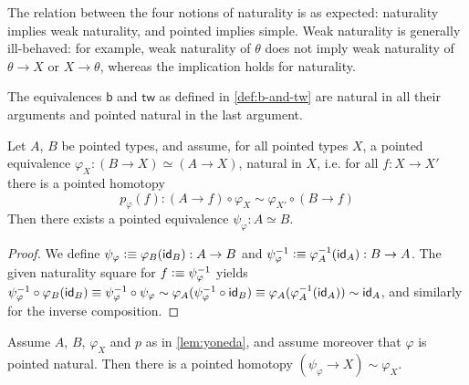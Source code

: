 \documentclass{article}
\renewcommand{\phi}{\varphi}
\renewcommand{\o}{\ensuremath{\circ}}
\newcommand{\sy}{^{-1}}
\newcommand{\two}{\mathsf{b}}
\newcommand{\twist}{\mathsf{tw}}
\begin{document}
\begin{rmk}
	The relation between the four notions of naturality is as expected: naturality implies weak naturality, and pointed implies simple. Weak naturality is generally ill-behaved: for example, weak naturality of $\theta$ does not imply weak naturality of $\theta \to X$ or $X \to \theta$, whereas the implication holds for naturality.
\end{rmk}

\begin{rmk}
	The equivalences $\two$ and $\twist$ as defined in \autoref{def:b-and-tw} are natural in all their arguments and pointed natural in the last argument.
\end{rmk}

\begin{lem}[Yoneda]\label{lem:yoneda}
	Let $A$, $B$ be pointed types, and assume, for all pointed types $X$, a pointed equivalence $\phi_X : (B \to X) \simeq (A \to X)$, natural in $X$, i.e. for all $f : X \to X'$ there is a pointed homotopy \[ p_\phi(f) : (A \to f) \o \phi_X \sim \phi_{X'} \o (B \to f) \]
	Then there exists a pointed equivalence $\psi_\phi : A \simeq B$.
\end{lem}
\begin{proof}
	We define $\psi_\phi \defeq \phi_B(\idfunc[B]) : A \to B$ and $\psi_\phi\sy \defeq \phi_A\sy(\idfunc[A]):B\to A$. The given naturality square for $f \defeq \psi_\phi\sy$ yields $\psi_\phi\sy \o \phi_B (\idfunc[B]) \judgeq \psi_\phi\sy \o \psi_\phi \sim \phi_A (\psi_\phi\sy \o \idfunc[B]) \judgeq \phi_A (\phi_A\sy (\idfunc[A])) \sim \idfunc[A]$, and similarly for the inverse composition.
\end{proof}

\begin{lem}\label{lem:yoneda-pointed}
	Assume $A$, $B$, $\phi_X$ and $p$ as in \autoref{lem:yoneda}, and assume moreover that $\phi$ is pointed natural. Then there is a pointed homotopy $(\psi_\phi \to X) \sim \phi_X$.
\end{lem}
\end{document}
